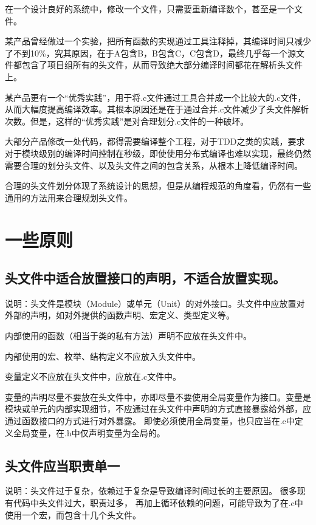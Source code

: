 在一个设计良好的系统中，修改一个文件，只需要重新编译数个，甚至是一个文件。

某产品曾经做过一个实验，把所有函数的实现通过工具注释掉，其编译时间只减少了不到10\%，究其原因，在于A包含B，B包含C，C包含D，最终几乎每一个源文件都包含了项目组所有的头文件，从而导致绝大部分编译时间都花在解析头文件上。

某产品更有一个“优秀实践”，用于将.c文件通过工具合并成一个比较大的.c文件，从而大幅度提高编译效率。其根本原因还是在于通过合并.c文件减少了头文件解析次数。但是，这样的“优秀实践”是对合理划分.c文件的一种破坏。

大部分产品修改一处代码，都得需要编译整个工程，对于TDD之类的实践，要求对于模块级别的编译时间控制在秒级，即使使用分布式编译也难以实现，最终仍然需要合理的划分头文件、以及头文件之间的包含关系，从根本上降低编译时间。

合理的头文件划分体现了系统设计的思想，但是从编程规范的角度看，仍然有一些通用的方法用来合理规划头文件。


\section{一些原则}


\subsection{头文件中适合放置接口的声明，不适合放置实现。}
说明：头文件是模块（Module）或单元（Unit）的对外接口。头文件中应放置对外部的声明，如对外提供的函数声明、宏定义、类型定义等。

内部使用的函数（相当于类的私有方法）声明不应放在头文件中。

内部使用的宏、枚举、结构定义不应放入头文件中。

变量定义不应放在头文件中，应放在.c文件中。

变量的声明尽量不要放在头文件中，亦即尽量不要使用全局变量作为接口。变量是模块或单元的内部实现细节，不应通过在头文件中声明的方式直接暴露给外部，应通过函数接口的方式进行对外暴露。 即使必须使用全局变量，也只应当在.c中定义全局变量，在.h中仅声明变量为全局的。


\subsection{头文件应当职责单一}
说明：头文件过于复杂，依赖过于复杂是导致编译时间过长的主要原因。 很多现有代码中头文件过大，职责过多， 再加上循环依赖的问题，可能导致为了在.c中使用一个宏，而包含十几个头文件。

